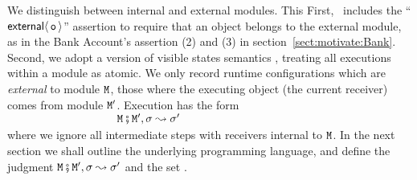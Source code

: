 We distinguish between internal and external modules. This %
First, 
\Chainmail\ includes the ``${\mathsf{external}}\langle\, {\mbox{\tt{o}}}\, \rangle$'' assertion to require
that an object belongs to the external module, as in the Bank
Account's assertion (2) and (3) in
section~\ref{sect:motivate:Bank}. Second, we adopt a version of
visible states semantics \cite{MuellerPoetzsch-HeffterLeavens06,larch93,Meyer97}, treating all
executions within a module as atomic.
We only record runtime configurations which are {\em external}
 to module ${\mbox{\tt{\ensuremath{{\mbox{\tt{M}}}}}}}$, \ie those where the
 executing object (\ie the current receiver) comes from module ${\mbox{\tt{\ensuremath{{\mbox{\tt{M}}}}}}}'$.
 Execution %
 has the form\\
 $~ \strut  \hspace{1.3in}    {\mbox{\tt{\ensuremath{{\mbox{\tt{M}}}}}}} \fatsemi  {{\mbox{\tt{\ensuremath{{\mbox{\tt{M}}}}}}}'},\sigma \leadsto \sigma'$\\  
where we ignore all intermediate steps
 with receivers  internal to ${\mbox{\tt{\ensuremath{{\mbox{\tt{M}}}}}}}$. 
%
In the next section we  shall 
outline the underlying programming language, and
define the judgment  ${\mbox{\tt{\ensuremath{{\mbox{\tt{M}}}}}}} \fatsemi  {{\mbox{\tt{\ensuremath{{\mbox{\tt{M}}}}}}}'},\sigma \leadsto \sigma'$ and the set 
.
 



